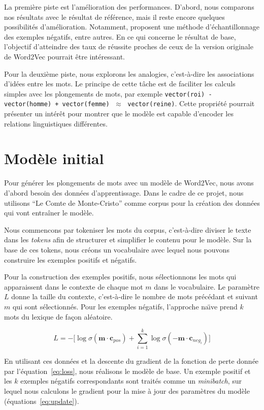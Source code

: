\documentclass[12pt]{article}
\begin{document}
La première piste est l'amélioration des performances. D'abord, nous comparons nos résultats avec le résultat de référence, mais il reste encore quelques possibilités d'amélioration. Notamment, \cite{DBLP:conf/nips/MikolovSCCD13} proposent une méthode d’échantillonnage des exemples négatifs, entre autres. En ce qui concerne le résultat de base, l'objectif d'atteindre des taux de réussite proches de ceux de la version originale de Word2Vec pourrait être intéressant.

Pour la deuxième piste, nous explorons les analogies, c'est-à-dire les associations d'idées entre les mots. Le principe de cette tâche est de faciliter les calculs simples avec les plongements de mots, par exemple \texttt{vector(roi) - vector(homme) + vector(femme)} $\;\approx\;$ \texttt{vector(reine)}. Cette propriété pourrait présenter un intérêt pour montrer que le modèle est capable d'encoder les relations linguistiques différentes.

\section{Modèle initial} \label{modèle initial}

Pour générer les plongements de mots avec un modèle de Word2Vec, nous avons d'abord besoin des données d'apprentissage. Dans le cadre de ce projet, nous utilisons ``Le Comte de Monte-Cristo'' comme corpus pour la création des données qui vont entraîner le modèle.

Nous commencons par tokeniser les mots du corpus, c'est-à-dire diviser le texte dans les \textit{tokens} afin de structurer et simplifier le contenu pour le modèle. Sur la base de ces tokens, nous créons un vocabulaire avec lequel nous pouvons construire les exemples positifs et négatifs.

Pour la construction des exemples positifs, nous sélectionnons les mots qui apparaissent dans le contexte de chaque mot $m$ dans le vocabulaire. Le paramètre $L$ donne la taille du contexte, c'est-à-dire le nombre de mots précédant et suivant $m$ qui sont sélectionnés. Pour les exemples négatifs, l'approche na\"\i ve prend $k$ mots du lexique de façon aléatoire. 

\begin{equation}\label{eq:loss}
    L = -\lbrack \log \sigma(\mathbf{m} \cdot \mathbf{c}_{pos}) + \sum_{i=1}^k \log \sigma(-\mathbf{m} \cdot \mathbf{c}_{neg_i}) \rbrack
\end{equation}

En utilisant ces données et la descente du gradient de la fonction de perte donnée par l'équation~\ref{eq:loss}, nous réalisons le modèle de base. Un exemple positif et les $k$ exemples négatifs correspondants sont traités comme un \textit{minibatch}, sur lequel nous calculons le gradient pour la mise à jour des paramètres du modèle (équations~\ref{eq:update}). 
\end{document}
